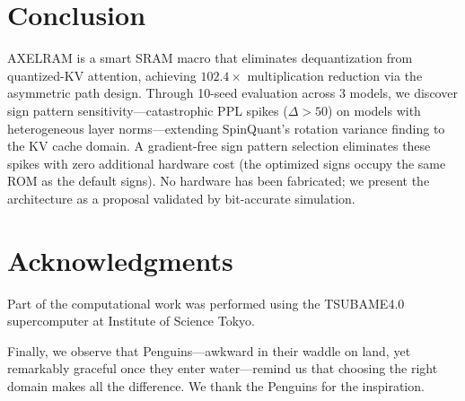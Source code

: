 \documentclass[conference]{IEEEtran}
\begin{document}
\section{Conclusion}

AXELRAM is a smart SRAM macro that eliminates dequantization from quantized-KV attention, achieving $102.4\times$ multiplication reduction via the asymmetric path design.
Through 10-seed evaluation across 3 models, we discover sign pattern sensitivity---catastrophic PPL spikes ($\Delta > 50$) on models with heterogeneous layer norms---extending SpinQuant's rotation variance finding to the KV cache domain.
A gradient-free sign pattern selection eliminates these spikes with zero additional hardware cost (the optimized signs occupy the same ROM as the default signs).
No hardware has been fabricated; we present the architecture as a proposal validated by bit-accurate simulation.

\section*{Acknowledgments}
Part of the computational work was performed using the TSUBAME4.0 supercomputer at Institute of Science Tokyo.

\medskip
Finally, we observe that Penguins---awkward in their waddle on land, yet remarkably graceful once they enter water---remind us that choosing the right domain makes all the difference.
We thank the Penguins for the inspiration.
\end{document}

